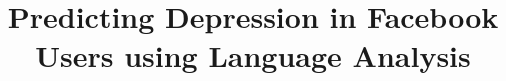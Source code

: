 \documentclass[11pt]{article}
\title{Predicting Depression in Facebook Users using Language Analysis}
\date{}
\begin{document}
\maketitle
\begin{abstract}
\end{abstract}


%







%
%
%
%
%
%
\end{document}
